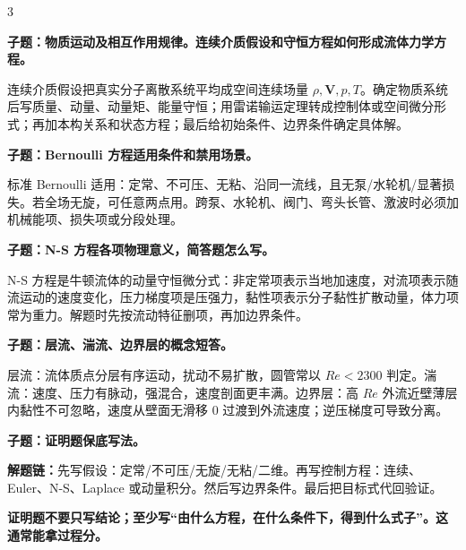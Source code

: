 \documentclass[a4paper]{article}
\newcommand{\qt}[1]{\vspace{0.10pt}\colorbox{Q}{\parbox{\dimexpr\linewidth-2\fboxsep}{\color{white}\bfseries #1}}\par}
\newcommand{\ans}[1]{\colorbox{G}{\parbox{\dimexpr\linewidth-2\fboxsep}{#1}}\par}
\newcommand{\warn}[1]{\colorbox{Y}{\parbox{\dimexpr\linewidth-2\fboxsep}{\color{E}\bfseries #1}}\par}
\newcommand{\chain}[1]{{\color{A}\bfseries 解题链：}#1\par}
\begin{document}
\begin{multicols}{3}
\qt{子题：物质运动及相互作用规律。连续介质假设和守恒方程如何形成流体力学方程。}
\ans{连续介质假设把真实分子离散系统平均成空间连续场量 $\rho,\bm V,p,T$。确定物质系统后写质量、动量、动量矩、能量守恒；用雷诺输运定理转成控制体或空间微分形式；再加本构关系和状态方程；最后给初始条件、边界条件确定具体解。}

\qt{子题：Bernoulli 方程适用条件和禁用场景。}
\ans{标准 Bernoulli 适用：定常、不可压、无粘、沿同一流线，且无泵/水轮机/显著损失。若全场无旋，可任意两点用。跨泵、水轮机、阀门、弯头长管、激波时必须加机械能项、损失项或分段处理。}

\qt{子题：N-S 方程各项物理意义，简答题怎么写。}
\ans{N-S 方程是牛顿流体的动量守恒微分式：非定常项表示当地加速度，对流项表示随流运动的速度变化，压力梯度项是压强力，黏性项表示分子黏性扩散动量，体力项常为重力。解题时先按流动特征删项，再加边界条件。}

\qt{子题：层流、湍流、边界层的概念短答。}
\ans{层流：流体质点分层有序运动，扰动不易扩散，圆管常以 $Re<2300$ 判定。湍流：速度、压力有脉动，强混合，速度剖面更丰满。边界层：高 $Re$ 外流近壁薄层内黏性不可忽略，速度从壁面无滑移 0 过渡到外流速度；逆压梯度可导致分离。}

\qt{子题：证明题保底写法。}
\chain{先写假设：定常/不可压/无旋/无粘/二维。再写控制方程：连续、Euler、N-S、Laplace 或动量积分。然后写边界条件。最后把目标式代回验证。}
\warn{证明题不要只写结论；至少写“由什么方程，在什么条件下，得到什么式子”。这通常能拿过程分。}



\end{multicols}
\end{document}
